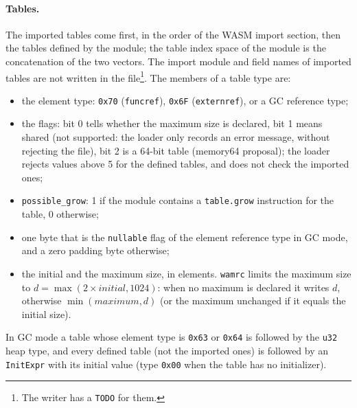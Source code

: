 \documentclass{article}
\begin{document}
\paragraph{Tables.}
The imported tables come first, in the order of the WASM import section, then the tables defined by the module; the table index space of the module is the concatenation of the two vectors.
The import module and field names of imported tables are not written in the file\footnote{The writer has a \texttt{TODO} for them.}.
The members of a table type are:
\begin{itemize}
    \item the element type: \verb|0x70| (\verb|funcref|), \verb|0x6F| (\verb|externref|), or a GC reference type;
    \item the flags: bit 0 tells whether the maximum size is declared, bit 1 means shared (not supported: the loader only records an error message, without rejecting the file), bit 2 is a 64-bit table (memory64 proposal); the loader rejects values above 5 for the defined tables, and does not check the imported ones;
    \item \verb|possible_grow|: 1 if the module contains a \verb|table.grow| instruction for the table, 0 otherwise;
    \item one byte that is the \verb|nullable| flag of the element reference type in GC mode, and a zero padding byte otherwise;
    \item the initial and the maximum size, in elements. \texttt{wamrc} limits the maximum size to $d = \max(2 \times \mathit{initial}, 1024)$: when no maximum is declared it writes $d$, otherwise $\min(\mathit{maximum}, d)$ (or the maximum unchanged if it equals the initial size).
\end{itemize}
In GC mode a table whose element type is \verb|0x63| or \verb|0x64| is followed by the \verb|u32| heap type, and every defined table (not the imported ones) is followed by an \verb|InitExpr| with its initial value (type \verb|0x00| when the table has no initializer).
\end{document}
